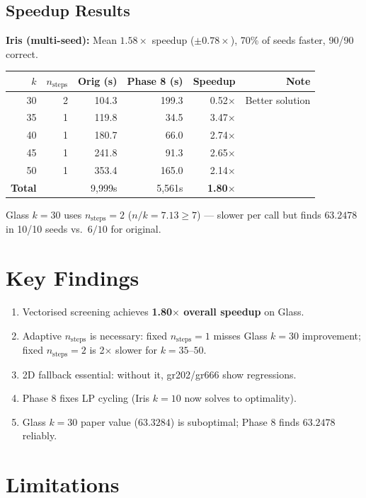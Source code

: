 \documentclass[12pt,a4paper]{article}
\begin{document}
\subsection{Speedup Results}

\textbf{Iris (multi-seed):} Mean $1.58\times$ speedup ($\pm 0.78\times$), 70\% of seeds faster, 90/90 correct.

\begin{center}
\begin{tabular}{rrrrrr}
\toprule
$k$ & $n_\text{steps}$ & Orig (s) & Phase 8 (s) & Speedup & Note \\
\midrule
30 & 2 & 104.3 & 199.3 & 0.52$\times$ & Better solution \\
35 & 1 & 119.8 & 34.5 & 3.47$\times$ & \\
40 & 1 & 180.7 & 66.0 & 2.74$\times$ & \\
45 & 1 & 241.8 & 91.3 & 2.65$\times$ & \\
50 & 1 & 353.4 & 165.0 & 2.14$\times$ & \\
\midrule
\textbf{Total} & & 9{,}999s & 5{,}561s & \textbf{1.80$\times$} & \\
\bottomrule
\end{tabular}
\end{center}

Glass $k=30$ uses $n_\text{steps}=2$ ($n/k=7.13 \geq 7$) — slower per call but finds $63.2478$ in 10/10 seeds vs.\ $6/10$ for original.

\section{Key Findings}

\begin{enumerate}
  \item Vectorised screening achieves \textbf{1.80$\times$ overall speedup} on Glass.
  \item Adaptive $n_\text{steps}$ is necessary: fixed $n_\text{steps}=1$ misses Glass $k=30$ improvement; fixed $n_\text{steps}=2$ is 2$\times$ slower for $k=35$--$50$.
  \item 2D fallback essential: without it, gr202/gr666 show regressions.
  \item Phase 8 fixes LP cycling (Iris $k=10$ now solves to optimality).
  \item Glass $k=30$ paper value ($63.3284$) is suboptimal; Phase 8 finds $63.2478$ reliably.
\end{enumerate}

\section{Limitations}
\end{document}
